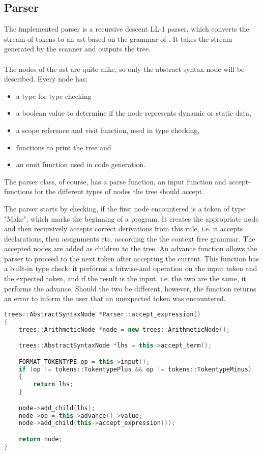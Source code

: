 \subsection{Parser}
The implemented parser is a recursive descent LL-1 parser, which converts the stream of tokens to an \ac{ast} based on the grammar of \langname{}. It takes the stream generated by the scanner and outputs the tree.\\
\\
The nodes of the \ac{ast} are quite alike, so only the abstract syntax node will be described. Every node has:
\begin{itemize}
\item a type for type checking
\item a boolean value to determine if the node represents dynamic or static data, 
\item a scope reference and visit function, used in type checking,
\item functions to print the tree and 
\item an emit function used in code generation.
\end{itemize}

The parser class, of course, has a parse function, an input function and accept-functions for the different types of nodes the tree should accept.

The parser starts by checking, if the first node encountered is a token of type "Make", which marks the beginning of a program. It creates the appropriate node and then recursively accepts correct derivations from this rule, i.e. it accepts declarations, then assignments etc. according the the context free grammar. The accepted nodes are added as children to the tree. An advance function allows the parser to proceed to the next token after accepting the current. This function has a built-in type check: it performs a bitwise-and operation on the input token and the expected token, and if the result is the input, i.e. the two are the same, it performs the advance. Should the two be different, however, the function returns an error to inform the user that an unexpected token was encountered.

\begin{lstlisting}[language = c++]
trees::AbstractSyntaxNode *Parser::accept_expression()
{
	trees::ArithmeticNode *node = new trees::ArithmeticNode();

	trees::AbstractSyntaxNode *lhs = this->accept_term();

	FORMAT_TOKENTYPE op = this->input();
	if (op != tokens::TokentypePlus && op != tokens::TokentypeMinus)
	{
		return lhs;
	}

	node->add_child(lhs);
	node->op = this->advance()->value;
	node->add_child(this->accept_expression());

	return node;
}
\end{lstlisting}

